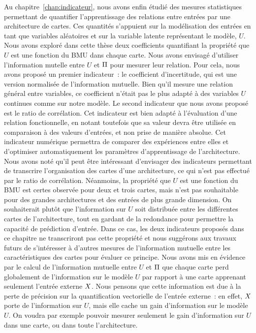 Au chapitre~\ref{chap:indicateur}, nous avons enfin étudié des mesures statistiques permettant de quantifier l'apprentissage des relations entre entrées par une architecture de cartes.
Ces quantités s'appuient sur la modélisation des entrées en tant que variables aléatoires et sur la variable latente représentant le modèle, $U$.
Nous avons exploré dans cette thèse deux coefficients quantifiant la propriété que $U$ est une fonction du BMU dans chaque carte. Nous avons envisagé d'utiliser l'information mutelle entre $U$ et $\Pi$ pour mesurer leur relation.
Pour cela, nous avons proposé un premier indicateur~: le coefficient d'incertitude, qui est une version normalisée de l'information mutuelle. Bien qu'il mesure une relation général entre variables, ce coefficient n'était pas le plus adapté à des variables $U$ continues comme sur notre modèle.
Le second indicateur que nous avons proposé est le ratio de corrélation. Cet indicateur est bien adapté à l'évaluation d'une relation fonctionnelle, en notant toutefois que sa valeur devra être utilisée en comparaison à des valeurs d'entrées, et non prise de manière absolue. Cet indicateur numérique permettra de comparer des expériences entre elles et d'optimiser automatiquement les paramètres d'apprentissage de l'architecture.
Nous avons noté qu'il peut être intéressant d'envisager des indicateurs permettant de transcrire l'organisation des cartes d'une architecture, ce qui n'est pas effectué par le ratio de corrélation.
Néanmoins, la propriété que $U$ est une fonction du BMU est certes observée pour deux et trois cartes, mais n'est pas souhaitable pour des grandes architectures et des entrées de plus grande dimension.
On souhaiterait plutôt que l'information sur $U$ soit distribuée entre les différentes cartes de l'architecture, tout en gardant de la redondance pour permettre la capacité de prédiction d'entrée.
Dans ce cas, les deux indicateurs proposés dans ce chapitre ne transcriront pas cette propriété et nous suggérons aux travaux futurs de s'intéresser à d'autres mesures de l'information mutuelle entre les caractéristiques des cartes pour évaluer ce principe.
Nous avons mis en évidence par le calcul de l'information mutuelle entre $U$ et $\Pi$ que chaque carte perd globalement de l'information sur le modèle $U$ par rapport à une carte apprenant seulement l'entrée externe $X$.
Nous pensons que cette information est due à la perte de précision sur la quantification vectorielle de l'entrée externe~: en effet, $X$ porte de l'information sur $U$, mais elle cache un gain d'information sur le modèle $U$.
On voudra par exemple pouvoir mesurer seulement le gain d'information sur $U$ dans une carte, ou dans toute l'architecture.

